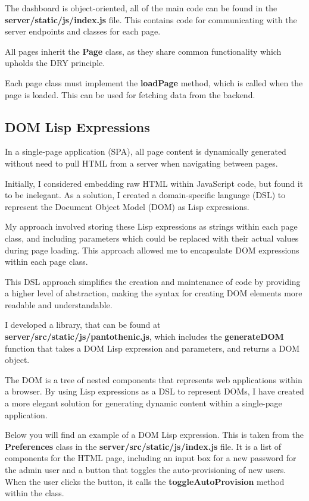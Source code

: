The dashboard is object-oriented,
all of the main code can be found in
the \textbf{server/static/js/index.js} file.
This contains code for communicating with
the server endpoints and classes for each page.

All pages inherit the \textbf{Page} class,
as they share common functionality which upholds the DRY principle.

Each page class must implement the \textbf{loadPage} method,
which is called when the page is loaded.
This can be used for fetching data from the backend.

\subsection{DOM Lisp Expressions}
In a single-page application (SPA), all page content
is dynamically generated without
need to pull HTML from a server when navigating between pages.

Initially, I considered embedding raw HTML within JavaScript code,
but found it to be inelegant.
As a solution, I created a domain-specific language (DSL)
to represent the Document Object Model (DOM) as Lisp expressions.

My approach involved storing these Lisp expressions as strings within each page class,
and including parameters which could be replaced with their actual values during page loading.
This approach allowed me to encapsulate DOM expressions within each page class.

This DSL approach simplifies the creation and maintenance of code by providing a higher level of abstraction,
making the syntax for creating DOM elements more readable and understandable.

I developed a library, that can be found at \textbf{server/src/static/js/pantothenic.js},
which includes the \textbf{generateDOM} function that takes a
DOM Lisp expression and parameters,
and returns a DOM object.

The DOM is a tree of nested components that represents web applications within a browser.
By using Lisp expressions as a DSL to represent DOMs,
I have created a more elegant solution for generating dynamic
content within a single-page application.

Below you will find an example of a DOM Lisp expression.
This is taken from the \textbf{Preferences} class in the
\textbf{server/src/static/js/index.js} file.
It is a list of components for the HTML page,
including an input box for a new password for the admin user
and a button that toggles the auto-provisioning of new users.
When the user clicks the button, it calls the
\textbf{toggleAutoProvision} method within the class.

